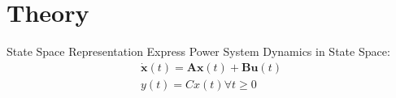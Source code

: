 \section[Theory]{Theory}
\label{sec:lasso_theory}

\begin{frame}[fragile]{State Space Representation}
	Express Power System Dynamics in State Space:
	\begin{equation}
		\label{eq:ssr}
		\begin{split}
			\dot{\textbf{x}}(t) = \textbf{A}\textbf{x}(t)
			+ \textbf{B}\textbf{u}(t)\\
			y(t) = Cx(t) \forall t\geq0
		\end{split}
	\end{equation}
\end{frame}